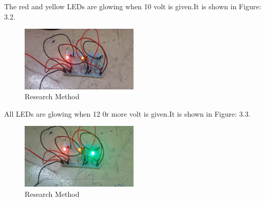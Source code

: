 \pagebreak
 The red and yellow LEDs are glowing when 10 volt is given.It is shown in Figure: 3.2.
\begin{figure}[h!] %
    \centering
    \includegraphics[width=0.5\textwidth]{11.png} %
    \caption{Research Method}
    \label{fig:sample}
\end{figure}
\newline
All LEDs are glowing when 12 0r more volt is given.It is shown in Figure: 3.3.
\begin{figure}[h!] %
    \centering
    \includegraphics[width=0.5\textwidth]{12.png} %
    \caption{Research Method}
    \label{fig:sample}
\end{figure}
